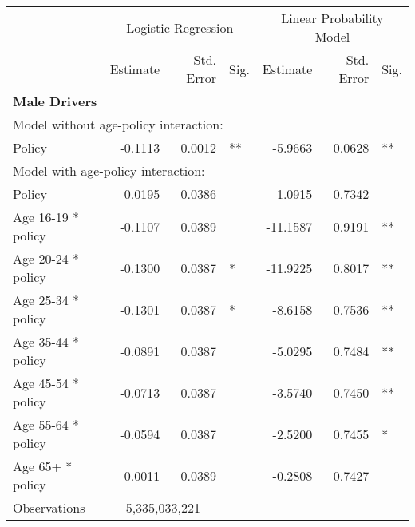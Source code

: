 
\begin{table}%
\centering 
\begin{tabular}{l r r l r r l} 

\hline 
 
 & \multicolumn{3}{c}{Logistic Regression}  & \multicolumn{3}{c}{Linear Probability Model} \\ 

 \cmidrule(lr){2-4}\cmidrule(lr){5-7} 
 & Estimate & Std. Error & Sig. & Estimate & Std. Error & Sig. \\ 

\hline 
 
\textbf{Male Drivers} \\ 

\hline
\multicolumn{7}{l}{Model without age-policy interaction: } \\ 
Policy                   &  -0.1113        &  0.0012       &   **       &  -5.9663        &  0.0628       &   **       \\ 
\hline
\multicolumn{7}{l}{Model with age-policy interaction: } \\ 
Policy                   &  -0.0195        &  0.0386       &            &  -1.0915        &  0.7342       &            \\ 
Age 16-19 * policy   &  -0.1107        &  0.0389       &            &  -11.1587        &  0.9191       &   **       \\ 
Age 20-24 * policy   &  -0.1300        &  0.0387       &    *       &  -11.9225        &  0.8017       &   **       \\ 
Age 25-34 * policy   &  -0.1301        &  0.0387       &    *       &  -8.6158        &  0.7536       &   **       \\ 
Age 35-44 * policy   &  -0.0891        &  0.0387       &            &  -5.0295        &  0.7484       &   **       \\ 
Age 45-54 * policy   &  -0.0713        &  0.0387       &            &  -3.5740        &  0.7450       &   **       \\ 
Age 55-64 * policy   &  -0.0594        &  0.0387       &            &  -2.5200        &  0.7455       &    *       \\ 
Age 65+ * policy   &  0.0011        &  0.0389       &            &  -0.2808        &  0.7427       &            \\ 
Observations & \multicolumn{2}{c}{5,335,033,221} \\ 



\end{tabular}
\end{table}
